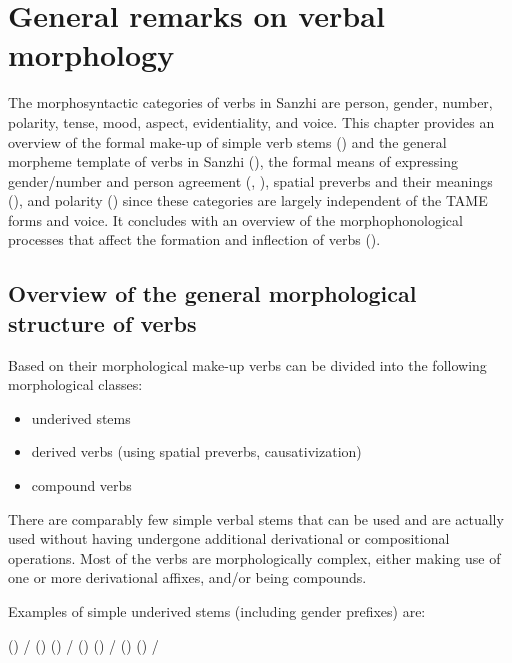 \chapter{General remarks on verbal morphology}
\label{cpt:verbs}

The morphosyntactic categories of verbs in Sanzhi are person, gender, number, polarity, tense, mood, aspect, evidentiality, and voice. This chapter provides an overview of the formal make-up of simple verb stems () and the general morpheme template of verbs in Sanzhi (), the formal means of expressing gender/number and person agreement (, ), spatial preverbs and their meanings (), and polarity () since these categories are largely independent of the TAME forms and voice. It concludes with an overview of the morphophonological processes that affect the formation and inflection of verbs ().



\section{Overview of the general morphological structure of verbs}
\label{sec:Overview about the general morphological structure of verbs}

Based on their morphological make-up verbs can be divided into the following morphological classes:
%
\begin{itemize}
	\item	underived stems
	\item	derived verbs (using spatial preverbs, causativization)
	\item	compound verbs
\end{itemize}

There are comparably few simple verbal stems that can be used and are actually used without having undergone additional derivational or compositional operations. Most of the verbs are morphologically complex, either making use of one or more derivational affixes, and/or being compounds.

Examples of simple underived stems (including gender prefixes) are:
%
\begin{exe}
	\ex	\label{ex:underived verbs verbs}
	\begin{xlist}
		\ex	 {} () /  () 
		\ex	{} () /  () 
		\ex	{} 
		\ex	{} () /  () 
		\ex	{} () /  
	\end{xlist}
\end{exe}

